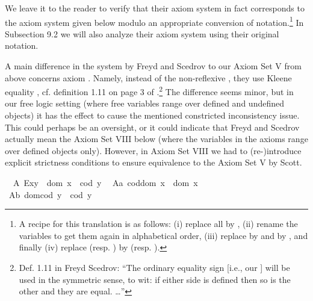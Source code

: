 \begin{isabellebody}
\begin{isamarkuptext}
  We leave it to the reader to verify that their axiom system in fact corresponds to the 
  axiom system given below modulo an appropriate conversion of notation.\footnote{A recipe for 
  this translation is as follows: (i) replace all  by , 
(ii) rename the variables to get them again in alphabetical order,
(iii) replace \isa{{\isasymphi}{\isasymbox}} by  and \isa{{\isasymbox}{\isasymphi}}  by , and finally
(iv) replace  (resp. ) 
   by  (resp. ).}
  In Subsection 9.2 we will also analyze their axiom system using their original notation.

  A main difference in the system by Freyd and Scedrov to our Axiom Set V from above concerns
  axiom . Namely, instead of the non-reflexive \isa{{\isasymsimeq}}, they use Kleene 
  equality \isa{{\isasymcong}}, cf. definition 1.11 on page 3 of \cite{FreydScedrov90}.\footnote{Def. 1.11 in Freyd 
  Scedrov: ``The ordinary equality sign \isa{{\isacharequal}} [i.e., our \isa{{\isasymcong}}] will be used in the
  symmetric sense, to wit: if either side is defined then so is the other and they are equal. \ldots''} 
  The difference seems minor, but in our free logic setting (where free variables range over defined 
  and undefined objects) it has the effect to cause the mentioned
  constricted inconsistency issue. This could perhaps be an oversight, or it could indicate
  that Freyd and Scedrov actually mean the Axiom Set VIII below (where the variables in the axioms range 
  over defined objects only). However, in Axiom Set VIII we had to (re-)introduce explicit 
  strictness conditions to ensure equivalence to the Axiom Set V by Scott.%
\end{isamarkuptext}\isamarkuptrue%
%
\isamarkuptrue%
\ \ A{}{\isacharcolon}\ {\isachardoublequoteopen}E{\isacharparenleft}x{\isasymcdot}y{\isacharparenright}\ \isactrlbold {\isasymleftrightarrow}\ dom\ x\ {\isasymsimeq}\ cod\ y{\isachardoublequoteclose}\ \isanewline
\ A{}a{\isacharcolon}\ {\isachardoublequoteopen}cod{\isacharparenleft}dom\ x{\isacharparenright}\ {\isasymcong}\ dom\ x{\isachardoublequoteclose}\ \ \ \isanewline
\ A{}b{\isacharcolon}\ {\isachardoublequoteopen}dom{\isacharparenleft}cod\ y{\isacharparenright}\ {\isasymcong}\ cod\ y{\isachardoublequoteclose}\ \ \ \isanewline

\end{isabellebody}
